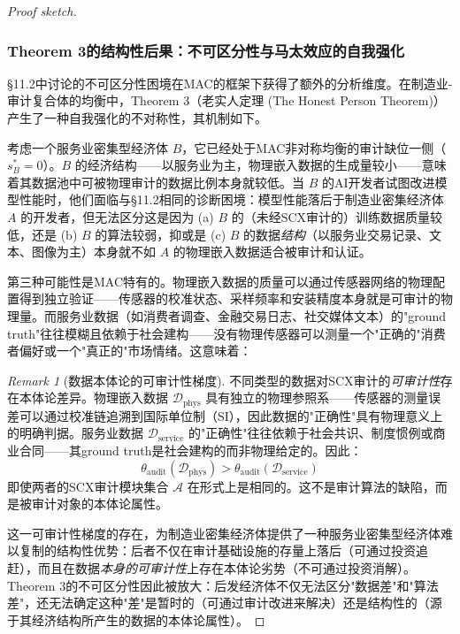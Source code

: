 \documentclass[12pt,a4paper]{ctexart}
\theoremstyle{definition}
\theoremstyle{remark}
\newtheorem{remark}{Remark}[section]
\begin{document}
\begin{proof}[Proof sketch]
\subsubsection*{Theorem 3的结构性后果：不可区分性与马太效应的自我强化}

§11.2中讨论的不可区分性困境在MAC的框架下获得了额外的分析维度。在制造业-审计复合体的均衡中，Theorem 3（老实人定理 (The Honest Person Theorem)）产生了一种自我强化的不对称性，其机制如下。

考虑一个服务业密集型经济体 $B$，它已经处于MAC非对称均衡的审计缺位一侧（$s_B^* = 0$）。$B$ 的经济结构——以服务业为主，物理嵌入数据的生成量较小——意味着其数据池中可被物理审计的数据比例本身就较低。当 $B$ 的AI开发者试图改进模型性能时，他们面临与§11.2相同的诊断困境：模型性能落后于制造业密集经济体 $A$ 的开发者，但无法区分这是因为 (a) $B$ 的（未经SCX审计的）训练数据质量较低，还是 (b) $B$ 的算法较弱，抑或是 (c) $B$ 的数据\textit{结构}（以服务业交易记录、文本、图像为主）本身就不如 $A$ 的物理嵌入数据适合被审计和认证。

第三种可能性是MAC特有的。物理嵌入数据的质量可以通过传感器网络的物理配置得到独立验证——传感器的校准状态、采样频率和安装精度本身就是可审计的物理量。而服务业数据（如消费者调查、金融交易日志、社交媒体文本）的"ground truth"往往模糊且依赖于社会建构——没有物理传感器可以测量一个"正确的"消费者偏好或一个"真正的"市场情绪。这意味着：

\begin{remark}[数据本体论的可审计性梯度]
不同类型的数据对SCX审计的\textit{可审计性}存在本体论差异。物理嵌入数据 $\mathcal{D}_{\text{phys}}$ 具有独立的物理参照系——传感器的测量误差可以通过校准链追溯到国际单位制（SI），因此数据的"正确性"具有物理意义上的明确判据。服务业数据 $\mathcal{D}_{\text{service}}$ 的"正确性"往往依赖于社会共识、制度惯例或商业合同——其ground truth是社会建构的而非物理给定的。因此：
\begin{equation}
\theta_{\text{audit}}(\mathcal{D}_{\text{phys}}) > \theta_{\text{audit}}(\mathcal{D}_{\text{service}})
\end{equation}
即使两者的SCX审计模块集合 $\mathcal{A}$ 在形式上是相同的。这不是审计算法的缺陷，而是被审计对象的本体论属性。
\end{remark}

这一可审计性梯度的存在，为制造业密集经济体提供了一种服务业密集型经济体难以复制的结构性优势：后者不仅在审计基础设施的存量上落后（可通过投资追赶），而且在数据\textit{本身的可审计性}上存在本体论劣势（不可通过投资消解）。Theorem 3的不可区分性因此被放大：后发经济体不仅无法区分"数据差"和"算法差"，还无法确定这种"差"是暂时的（可通过审计改进来解决）还是结构性的（源于其经济结构所产生的数据的本体论属性）。


\end{proof}
\end{document}
